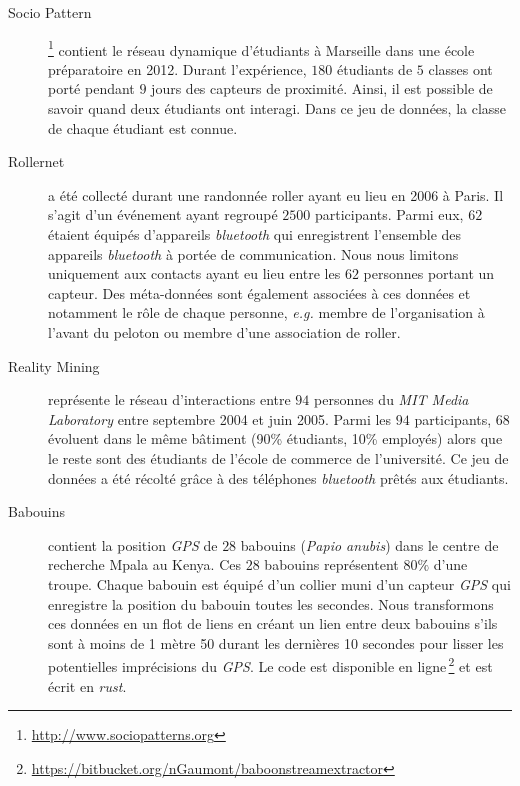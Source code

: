\begin{description}
\item[Socio Pattern~\cite{Fournet2014}]\footnote{\url{http://www.sociopatterns.org}} contient le réseau dynamique d'étudiants à Marseille dans une école préparatoire en 2012. Durant l'expérience, $180$ étudiants de $5$ classes ont porté pendant $9$ jours des capteurs de proximité.
Ainsi, il est possible de savoir quand deux étudiants ont interagi. 
Dans ce jeu de données, la classe de chaque étudiant est connue.\\

\item[Rollernet~\cite{Tournoux2009}] a été collecté durant une randonnée roller ayant eu lieu en 2006 à Paris.
Il s'agit d'un événement ayant regroupé $2500$ participants.
Parmi eux, $62$ étaient équipés d'appareils \emph{bluetooth} qui enregistrent l'ensemble des appareils \emph{bluetooth} à portée de communication.
Nous nous limitons uniquement aux contacts ayant eu lieu entre les $62$ personnes portant un capteur.
Des méta-données sont également associées à ces données et notamment le rôle de chaque personne, \emph{e.g.} membre de l'organisation à l'avant du peloton ou membre d'une association de roller.\\

\item[Reality Mining~\cite{Eagle2009}] représente le réseau d'interactions entre $94$ personnes du \emph{MIT Media Laboratory} entre septembre 2004 et juin 2005.
Parmi les $94$ participants, $68$ évoluent dans le même bâtiment (90\% étudiants, 10\% employés) alors que le reste sont des étudiants de l'école de commerce de l'université.
Ce jeu de données a été récolté grâce à des téléphones \emph{bluetooth} prêtés aux étudiants.\\

\item[Babouins~\cite{Crofoot2015,Strandburg-Peshkin2015}] contient la position \emph{GPS} de $28$ babouins (\emph{Papio anubis}) dans le centre de recherche Mpala au Kenya.
Ces $28$ babouins représentent $80\%$ d'une troupe.
Chaque babouin est équipé d'un collier muni d'un capteur \emph{GPS} qui enregistre la position du babouin toutes les secondes.
Nous transformons ces données en un flot de liens en créant un lien entre deux babouins s'ils sont à moins de 1 mètre 50 durant les dernières 10 secondes pour lisser les potentielles imprécisions du \emph{GPS}.
Le code est disponible en ligne\,\footnote{\url{https://bitbucket.org/nGaumont/baboonstreamextractor}} et est écrit en \emph{rust}.
\end{description}

